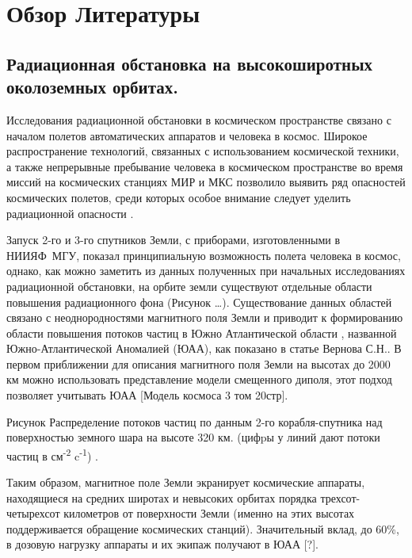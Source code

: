\chapter{Обзор Литературы} \label{chapt1}

\section{Радиационная обстановка на высокоширотных околоземных орбитах. } \label{sect1_1}

Исследования радиационной обстановки в космическом пространстве связано с началом полетов автоматических аппаратов и человека в космос.  Широкое распространение технологий, связанных с использованием космической техники, а также непрерывные пребывание человека в космическом пространстве во время миссий на космических станциях МИР и МКС позволило выявить ряд опасностей космических полетов, среди которых особое внимание следует уделить радиационной опасности \cite{logachev2007}.


Запуск 2-го и 3-го спутников Земли, с приборами, изготовленными в НИИЯФ~МГУ,  
показал принципиальную возможность полета человека в космос,  однако, как можно 
заметить из данных полученных при начальных исследованиях радиационной 
обстановки, на орбите земли существуют отдельные области повышения 
радиационного фона 
(Рисунок \ldots{}). Существование данных областей связано с неоднородностями 
магнитного поля Земли и приводит к формированию области повышения потоков 
частиц в 
Южно Атлантической области \cite{logachev2007}, названной Южно-Атлантической 
Аномалией (ЮАА), как показано в статье Вернова С.Н.\cite{vernov1961}. В первом 
приближении для описания магнитного поля  Земли на высотах до 2000 км можно 
использовать представление модели смещенного диполя, этот подход позволяет 
учитывать ЮАА [Модель космоса 3 том 20стр].

Рисунок Распределение потоков частиц по данным 2-го корабля-спутника над поверхностью земного шара на высоте 320 км. (цифpы у линий дают потоки частиц в см\textsuperscript{-2} c\textsuperscript{-1}) \cite{logachev2007}.


Таким образом, магнитное поле Земли экранирует космические аппараты, находящиеся на средних широтах и невысоких орбитах порядка трехсот-четырехсот километров от поверхности Земли (именно на этих высотах поддерживается обращение космических станций). Значительный вклад, до 60\%,  в дозовую нагрузку аппараты и их экипаж получают в ЮАА [?].


